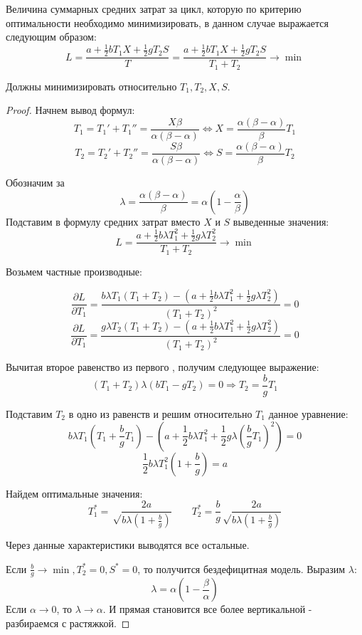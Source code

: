 \documentclass[aps,%
12pt,%
final,%
oneside,
onecolumn,%
musixtex, %
superscriptaddress,%
centertags]{article} %
\theoremstyle{plain}
\theoremstyle{definition}
\theoremstyle{remark}
\begin{document}
Величина суммарных средних затрат за цикл, которую по критерию оптимальности необходимо минимизировать, в данном случае выражается следующим образом:
$$L = \frac{a+\frac{1}{2}bT_1X +\frac{1}{2} g T_2 S}{T} = \frac{a+\frac{1}{2}bT_1X + \frac{1}{2}g T_2 S}{T_1 + T_2} \to \min$$

Должны минимизировать относительно $T_1,T_2,X,S$.
\begin{proof}
	Начнем вывод формул:
	$$T_1 = T_1'+T_1''  = \frac{X\beta}{\alpha(\beta-\alpha)} \Leftrightarrow X = \frac{\alpha(\beta-\alpha)}{\beta}T_1$$
	$$T_2 = T_2'+T_2'' = \frac{S\beta}{\alpha(\beta-\alpha)} \Leftrightarrow S = \frac{\alpha(\beta-\alpha)}{\beta}T_2$$

	Обозначим за
	$$\lambda = \frac{\alpha(\beta-\alpha)}{\beta} = \alpha \left(1 - \frac{\alpha}{\beta}\right)$$
	Подставим в формулу средних затрат вместо $X$ и $S$ выведенные значения:
	$$ L = \frac{a+\frac{1}{2}b\lambda T_1^2 + \frac{1}{2}g\lambda T_2^2 }{T_1 + T_2} \to \min $$

	Возьмем частные производные:

	$$ \frac{\partial L}{\partial T_1} = \frac{b\lambda T_1(T_1+T_2) - (a + \frac{1}{2}b\lambda T_1^2 + \frac{1}{2}g\lambda T_2^2)}{(T_1+T_2)^2} = 0$$
	$$ \frac{\partial L}{\partial T_1} = \frac{g\lambda T_2(T_1+T_2) - (a + \frac{1}{2}b\lambda T_1^2 + \frac{1}{2}g\lambda T_2^2)}{(T_1+T_2)^2} = 0$$

	Вычитая второе равенство из первого , получим следующее выражение:
	$$ (T_1+T_2) \lambda (bT_1 - gT_2) =0 \Rightarrow T_2 = \frac{b}{g}T_1$$

	Подставим $T_2$ в одно из равенств и решим относительно $T_1$ данное уравнение:
	$$ b\lambda T_1\left(T_1+\frac{b}{g}T_1\right) - \left(a + \frac{1}{2}b\lambda T_1^2 + \frac{1}{2}g\lambda \left(\frac{b}{g}T_1\right)^2\right) = 0$$
	$$ \frac{1}{2}b\lambda T_1^2 \left(1+\frac{b}{g}\right) = a$$

	Найдем оптимальные значения:
	$$T_1^* = \sqrt \frac{2a}{b\lambda (1+\frac{b}{g})} \qquad T_2^* = \frac{b}{g} \sqrt \frac{2a}{b\lambda (1+\frac{b}{g})} $$

	Через данные характеристики выводятся все остальные.

	Если $\frac{b}{g} \to \min , T_2^* = 0, S^* = 0$, то получится бездефицитная модель.
	Выразим $\lambda$: 
	$$ \lambda = \alpha (1-\frac{\beta}{\alpha})$$
	Если $\alpha \to 0$, то $\lambda \to \alpha $. И прямая становится все более вертикальной - разбираемся с растяжкой.
\end{proof}
\end{document}
